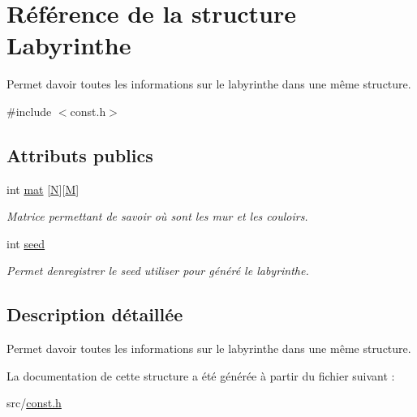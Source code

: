 \hypertarget{structLabyrinthe}{}\section{Référence de la structure Labyrinthe}
\label{structLabyrinthe}


Permet d\textquotesingle{}avoir toutes les informations sur le labyrinthe dans une même structure.  




{\ttfamily \#include $<$const.\+h$>$}

\subsection*{Attributs publics}
\begin{DoxyCompactItemize}
\item 
\mbox{\label{structLabyrinthe_aa047f6d89571cabb969a273d6d575859}} 
int \hyperlink{structLabyrinthe_aa047f6d89571cabb969a273d6d575859}{mat} \mbox{[}\hyperlink{const_8h_a0240ac851181b84ac374872dc5434ee4}{N}\mbox{]}\mbox{[}\hyperlink{const_8h_a52037c938e3c1b126c6277da5ca689d0}{M}\mbox{]}
\begin{DoxyCompactList}\small\item\em Matrice permettant de savoir où sont les mur et les couloirs. \end{DoxyCompactList}\item 
\mbox{\label{structLabyrinthe_a29c89736db2d4f49d75ef8c7be8759b9}} 
int \hyperlink{structLabyrinthe_a29c89736db2d4f49d75ef8c7be8759b9}{seed}
\begin{DoxyCompactList}\small\item\em Permet d\textquotesingle{}enregistrer le seed utiliser pour généré le labyrinthe. \end{DoxyCompactList}\end{DoxyCompactItemize}


\subsection{Description détaillée}
Permet d\textquotesingle{}avoir toutes les informations sur le labyrinthe dans une même structure. 

La documentation de cette structure a été générée à partir du fichier suivant \+:\begin{DoxyCompactItemize}
\item 
src/\hyperlink{const_8h}{const.\+h}\end{DoxyCompactItemize}
